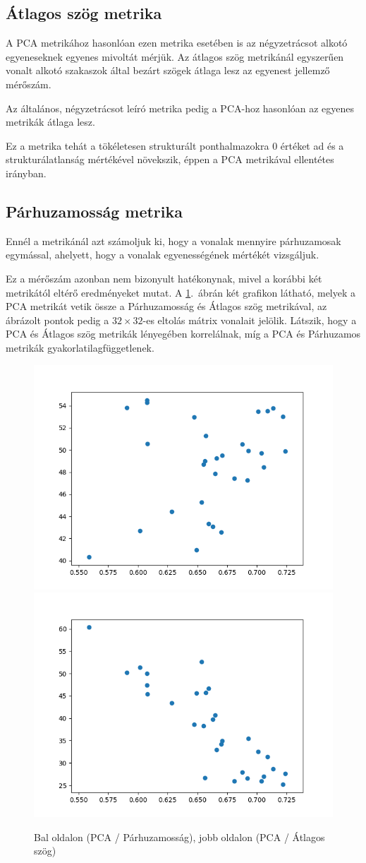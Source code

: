 \subsection{Átlagos szög metrika}

A PCA metrikához hasonlóan ezen metrika esetében is az négyzetrácsot alkotó egyeneseknek egyenes mivoltát mérjük. Az átlagos szög metrikánál egyszerűen vonalt alkotó szakaszok által bezárt szögek átlaga lesz az egyenest jellemző mérőszám. 

Az általános, négyzetrácsot leíró metrika pedig a PCA-hoz hasonlóan az egyenes metrikák átlaga lesz.

Ez a metrika tehát a tökéletesen strukturált ponthalmazokra $0$ értéket ad és a strukturálatlanság mértékével növekszik, éppen a PCA metrikával ellentétes irányban.

\subsection{Párhuzamosság metrika}

Ennél a metrikánál azt számoljuk ki, hogy a vonalak mennyire párhuzamosak egymással, ahelyett, hogy a vonalak egyenességének mértékét vizsgáljuk. 

Ez a mérőszám azonban nem bizonyult hatékonynak, mivel a korábbi két metrikától eltérő eredményeket mutat. A \ref{para2}.~ábrán két grafikon látható, melyek a PCA metrikát vetik össze a Párhuzamosság és Átlagos szög metrikával, az ábrázolt pontok pedig a $32\times32$-es eltolás mátrix vonalait jelölik. Látszik, hogy a PCA és Átlagos szög metrikák lényegében korrelálnak, míg a PCA és Párhuzamos metrikák gyakorlatilagfüggetlenek.

\begin{figure}[h!]
	\begin{center}
	\includegraphics[width=0.45\linewidth]{evr-vs-parallelness-ldim10.png}
		\includegraphics[width=0.45\linewidth]{evr-vs-straightness-ldim10.png}
	\end{center}
  \caption{Bal oldalon (PCA / Párhuzamosság), jobb oldalon (PCA / Átlagos szög)}\label{para2}
\end{figure}


